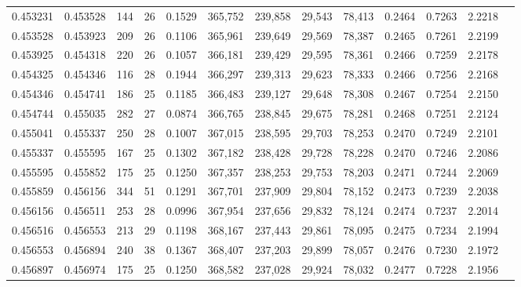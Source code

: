 \begin{tabular}{rrrrrrrrrrrrr}
0.453231 & 0.453528 &   144 &  26 &                                     0.1529 & 365,752 & 239,858 &  29,543 &  78,413 & 0.2464 & 0.7263 & 2.2218 \\
0.453528 & 0.453923 &   209 &  26 &                                     0.1106 & 365,961 & 239,649 &  29,569 &  78,387 & 0.2465 & 0.7261 & 2.2199 \\
0.453925 & 0.454318 &   220 &  26 &                                     0.1057 & 366,181 & 239,429 &  29,595 &  78,361 & 0.2466 & 0.7259 & 2.2178 \\
0.454325 & 0.454346 &   116 &  28 &                                     0.1944 & 366,297 & 239,313 &  29,623 &  78,333 & 0.2466 & 0.7256 & 2.2168 \\
0.454346 & 0.454741 &   186 &  25 &                                     0.1185 & 366,483 & 239,127 &  29,648 &  78,308 & 0.2467 & 0.7254 & 2.2150 \\
0.454744 & 0.455035 &   282 &  27 &                                     0.0874 & 366,765 & 238,845 &  29,675 &  78,281 & 0.2468 & 0.7251 & 2.2124 \\
0.455041 & 0.455337 &   250 &  28 &                                     0.1007 & 367,015 & 238,595 &  29,703 &  78,253 & 0.2470 & 0.7249 & 2.2101 \\
0.455337 & 0.455595 &   167 &  25 &                                     0.1302 & 367,182 & 238,428 &  29,728 &  78,228 & 0.2470 & 0.7246 & 2.2086 \\
0.455595 & 0.455852 &   175 &  25 &                                     0.1250 & 367,357 & 238,253 &  29,753 &  78,203 & 0.2471 & 0.7244 & 2.2069 \\
0.455859 & 0.456156 &   344 &  51 &                                     0.1291 & 367,701 & 237,909 &  29,804 &  78,152 & 0.2473 & 0.7239 & 2.2038 \\
0.456156 & 0.456511 &   253 &  28 &                                     0.0996 & 367,954 & 237,656 &  29,832 &  78,124 & 0.2474 & 0.7237 & 2.2014 \\
0.456516 & 0.456553 &   213 &  29 &                                     0.1198 & 368,167 & 237,443 &  29,861 &  78,095 & 0.2475 & 0.7234 & 2.1994 \\
0.456553 & 0.456894 &   240 &  38 &                                     0.1367 & 368,407 & 237,203 &  29,899 &  78,057 & 0.2476 & 0.7230 & 2.1972 \\
0.456897 & 0.456974 &   175 &  25 &                                     0.1250 & 368,582 & 237,028 &  29,924 &  78,032 & 0.2477 & 0.7228 & 2.1956 \\

\end{tabular}
